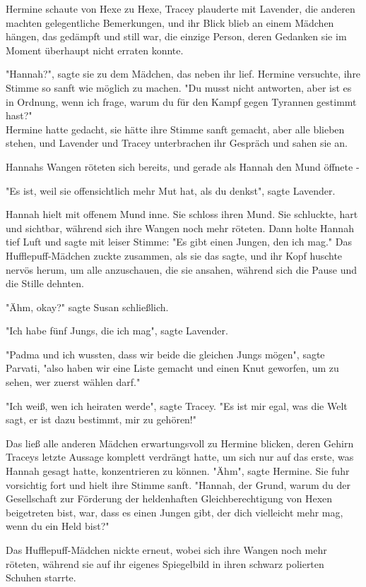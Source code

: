 {Hermine schaute von Hexe zu Hexe, Tracey plauderte mit Lavender, die anderen machten gelegentliche Bemerkungen, und ihr Blick blieb an einem Mädchen hängen, das gedämpft und still war, die einzige Person, deren Gedanken sie im Moment überhaupt nicht erraten konnte.

"Hannah?", sagte sie zu dem Mädchen, das neben ihr lief. Hermine versuchte, ihre Stimme so sanft wie möglich zu machen. "Du musst nicht antworten, aber ist es in Ordnung, wenn ich frage, warum du für den Kampf gegen Tyrannen gestimmt hast?"\\ Hermine hatte gedacht, sie hätte ihre Stimme sanft gemacht, aber alle blieben stehen, und Lavender und Tracey unterbrachen ihr Gespräch und sahen sie an.

Hannahs Wangen röteten sich bereits, und gerade als Hannah den Mund öffnete -

"Es ist, weil sie offensichtlich mehr Mut hat, als du denkst", sagte Lavender.

Hannah hielt mit offenem Mund inne. Sie schloss ihren Mund. Sie schluckte, hart und sichtbar, während sich ihre Wangen noch mehr röteten. Dann holte Hannah tief Luft und sagte mit leiser Stimme: "Es gibt einen Jungen, den ich mag." Das Hufflepuff-Mädchen zuckte zusammen, als sie das sagte, und ihr Kopf huschte nervös herum, um alle anzuschauen, die sie ansahen, während sich die Pause und die Stille dehnten.

"Ähm, okay?" sagte Susan schließlich.

"Ich habe fünf Jungs, die ich mag", sagte Lavender.

"Padma und ich wussten, dass wir beide die gleichen Jungs mögen", sagte Parvati, "also haben wir eine Liste gemacht und einen Knut geworfen, um zu sehen, wer zuerst wählen darf."

"Ich weiß, wen ich heiraten werde", sagte Tracey. "Es ist mir egal, was die Welt sagt, er ist dazu bestimmt, mir zu gehören!"

Das ließ alle anderen Mädchen erwartungsvoll zu Hermine blicken, deren Gehirn Traceys letzte Aussage komplett verdrängt hatte, um sich nur auf das erste, was Hannah gesagt hatte, konzentrieren zu können. "Ähm", sagte Hermine. Sie fuhr vorsichtig fort und hielt ihre Stimme sanft. "Hannah, der Grund, warum du der Gesellschaft zur Förderung der heldenhaften Gleichberechtigung von Hexen beigetreten bist, war, dass es einen Jungen gibt, der dich vielleicht mehr mag, wenn du ein Held bist?"

Das Hufflepuff-Mädchen nickte erneut, wobei sich ihre Wangen noch mehr röteten, während sie auf ihr eigenes Spiegelbild in ihren schwarz polierten Schuhen starrte.

}
